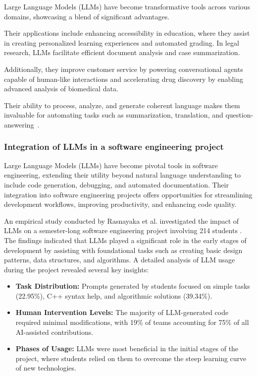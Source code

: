 Large Language Models (LLMs) have become transformative tools across various domains, showcasing a blend of significant advantages. 

Their applications include enhancing accessibility in education, where they assist in creating personalized learning experiences and automated grading. In legal research, LLMs facilitate efficient document analysis and case summarization. 

Additionally, they improve customer service by powering conversational agents capable of human-like interactions and accelerating drug discovery by enabling advanced analysis of biomedical data. 

Their ability to process, analyze, and generate coherent language makes them invaluable for automating tasks such as summarization, translation, and question-answering~\cite{12}.

\subsubsection{Integration of LLMs in a software engineering project}
Large Language Models (LLMs) have become pivotal tools in software engineering, extending their utility beyond natural language understanding to include code generation, debugging, and automated documentation. Their integration into software engineering projects offers opportunities for streamlining development workflows, improving productivity, and enhancing code quality.

An empirical study conducted by Rasnayaka et al. investigated the impact of LLMs on a semester-long software engineering project involving 214 students \cite{8}. The findings indicated that LLMs played a significant role in the early stages of development by assisting with foundational tasks such as creating basic design patterns, data structures, and algorithms. A detailed analysis of LLM usage during the project revealed several key insights:
\begin{itemize}
    \item \textbf{Task Distribution:} Prompts generated by students focused on simple tasks (22.95\%), C++ syntax help, and algorithmic solutions (39.34\%).
    \item \textbf{Human Intervention Levels:} The majority of LLM-generated code required minimal modifications, with 19\% of teams accounting for 75\% of all AI-assisted contributions.
    \item \textbf{Phases of Usage:} LLMs were most beneficial in the initial stages of the project, where students relied on them to overcome the steep learning curve of new technologies.
\end{itemize}

